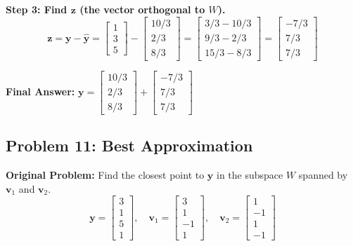 \documentclass[11pt, letterpaper]{article}
\theoremstyle{definition}
\theoremstyle{remark}
\begin{document}
\textbf{Step 3: Find $\mathbf{z}$ (the vector orthogonal to $W$).}
\[ \mathbf{z} = \mathbf{y} - \hat{\mathbf{y}} = \begin{bmatrix} 1 \\ 3 \\ 5 \end{bmatrix} - \begin{bmatrix} 10/3 \\ 2/3 \\ 8/3 \end{bmatrix} = \begin{bmatrix} 3/3 - 10/3 \\ 9/3 - 2/3 \\ 15/3 - 8/3 \end{bmatrix} = \begin{bmatrix} -7/3 \\ 7/3 \\ 7/3 \end{bmatrix} \]

\textbf{Final Answer:} $\mathbf{y} = \begin{bmatrix} 10/3 \\ 2/3 \\ 8/3 \end{bmatrix} + \begin{bmatrix} -7/3 \\ 7/3 \\ 7/3 \end{bmatrix}$

\vspace{1em}
\subsection{Problem 11: Best Approximation}
\textbf{Original Problem:} Find the closest point to $\mathbf{y}$ in the subspace $W$ spanned by $\mathbf{v}_1$ and $\mathbf{v}_2$.
\[ \mathbf{y} = \begin{bmatrix} 3 \\ 1 \\ 5 \\ 1 \end{bmatrix}, \quad \mathbf{v}_1 = \begin{bmatrix} 3 \\ 1 \\ -1 \\ 1 \end{bmatrix}, \quad \mathbf{v}_2 = \begin{bmatrix} 1 \\ -1 \\ 1 \\ -1 \end{bmatrix} \]
\end{document}
